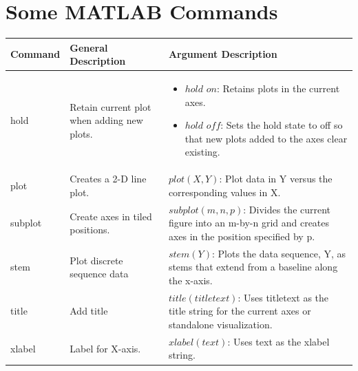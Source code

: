 \documentclass{lab_sheet}
\begin{document}
    \section{Some MATLAB Commands}
  \begin{table}[H]
    \centering
    \begin{tabular}{||C{3cm}||C{4cm}||C{7.5cm}||}
        \toprule
        \textbf{Command}& \textbf{General Description} & \textbf{Argument Description}\\
        \midrule
        \midrule
        hold & Retain current plot when adding new plots.  & \begin{itemize}
            \item $hold$ $on$: Retains plots in the current axes. 
            \item $hold$ $off$: Sets the hold state to off so that new plots added to the axes clear existing.
        \end{itemize}
        \\
        \hline
        plot    & Creates a 2-D line plot.                    & $plot(X,Y)$: Plot data in Y versus the corresponding values in X.                                                                                                                                      \\ \hline
    subplot & Create axes in tiled positions.             & $subplot(m,n,p)$: Divides the current figure into an m-by-n grid and creates axes in the position specified by p.                                                                                      \\ \hline
    stem    & Plot discrete sequence data                 &  $stem(Y)$: Plots the data sequence, Y, as stems that extend from a baseline along the x-axis.                                                                                                         \\ \hline
    title   & Add title                                   & $title(titletext)$: Uses titletext as the title string for the current axes or standalone visualization.                                                                                                            \\ \hline
    xlabel  & Label for X-axis.                           & $xlabel(text)$: Uses text as the xlabel string.                                                                                                                                                                \\ \hline

\end{tabular}
\end{table}
\end{document}
